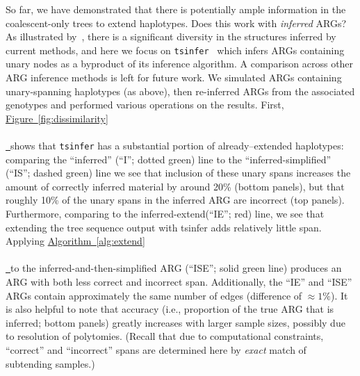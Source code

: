 \documentclass[10pt,twoside,lineno]{gsajnl}
\newcommand{\tsinfer}{\texttt{tsinfer}}
\newcommand{\algorithmref}[2][]{%
	\hyperref[{#2}]{%
		Algorithm~\ref*{#2}%
		\ifx\\#1\\%
		\else
		\,#1%
		\fi
	}%
}
\newcommand*{\figref}[2][]{%
	\hyperref[{#2}]{%
		Figure~\ref*{#2}%
		\ifx\\#1\\%
		\else
		\,#1%
		\fi
	}%
}
\begin{document}
So far, we have demonstrated that there is potentially ample information
in the coalescent-only trees to extend haplotypes.
Does this work with \emph{inferred} ARGs?
As illustrated by~\cite{wong2024general}, there is a significant diversity
in the structures inferred by current methods,
and here we focus on \tsinfer{}~\cite{kelleher2019inferring} which 
infers ARGs containing unary nodes as a byproduct of its inference algorithm.
A comparison across other ARG inference methods is left for future work.
We simulated ARGs containing unary-spanning haplotypes (as above), then
re-inferred ARGs from the associated genotypes and performed various operations
on the results.
First, \figref{fig:dissimilarity} shows that \tsinfer{}
has a substantial portion of already--extended haplotypes:
comparing the ``inferred'' (``I''; dotted green) line to the ``inferred-simplified'' (``IS''; dashed green) line
we see that inclusion of these unary spans increases the amount of correctly inferred material
by around 20\% (bottom panels),
but that roughly 10\% of the unary spans in the inferred ARG are incorrect (top panels).
Furthermore, comparing to the inferred-extend(``IE''; red) line, we see that extending the tree sequence output with tsinfer adds relatively little span.
Applying \algorithmref{alg:extend} to the inferred-and-then-simplified ARG
(``ISE''; solid green line)
produces an ARG with both less correct and incorrect span.
Additionally, the ``IE'' and ``ISE'' ARGs 
contain approximately the same number of edges (difference of $\approx 1\%$).
It is also helpful to note that accuracy
(i.e., proportion of the true ARG that is inferred; bottom panels)
greatly increases with larger sample sizes,
possibly due to resolution of polytomies.
(Recall that due to computational constraints,
``correct'' and ``incorrect'' spans are determined here by \emph{exact} match
of subtending samples.)

%    
%
\end{document}

